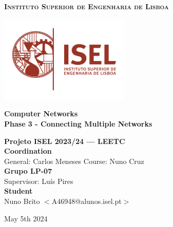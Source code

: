 \documentclass[11pt,a4paper]{report}
\newcommand{\school}{Instituto Superior de Engenharia de Lisboa}
\newcommand{\projisel}{Projeto ISEL 2023/24 --- LEETC}
\newcommand{\projtitle}{Computer Networks}
\newcommand{\projsubtitle}{Phase 3 - Connecting Multiple Networks}
\newcommand{\projteam}{Grupo LP-07}
\begin{document}
    \setcounter{page}{1}

\begin{titlepage}
    \center

    \vspace*{-12mm}
    {\large \textbf{\textsc{\school}}}\\

    \vfill

    \includegraphics[width=62mm]{logoisel}
    
    \vfill
    
    {\huge \textbf{\projtitle}}\\[6mm]
    {\Large \textbf{\projsubtitle}}\\
    
    \vfill
    
    \vfill
    
    {\Large \textbf{\projisel}}\\[12mm]
    
    {\Large \textbf{Coordination}}\\[4mm]
    {\large General: Carlos Meneses\hspace*{18mm}
            Course: Nuno Cruz}\\[6mm]
    
    {\Large \textbf{\projteam}}\\[4mm]
    {\large Supervisor: Luís Pires\hspace*{12mm}}\\[6mm]
    
    {\Large \textbf{Student}}\\[4mm]
    {\large Nuno Brito $<$A46948@alunos.isel.pt$>$}
    
    \vspace*{10mm}
    
    \renewcommand{\today}{May 5th 2024}
    \today
    
\end{titlepage}

\tableofcontents
\end{document}
